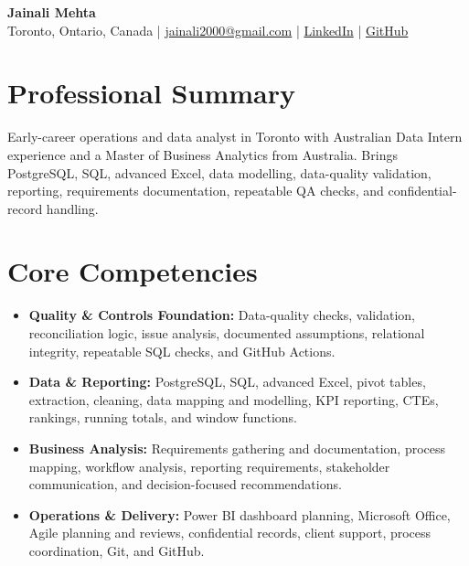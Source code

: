 \documentclass[letterpaper,10pt]{article}
\begin{document}
\begin{center}
  {\fontsize{17}{19}\selectfont\textbf{Jainali Mehta}}\\[2pt]
  \small Toronto, Ontario, Canada \;|\;
  \href{mailto:jainali2000@gmail.com}{jainali2000@gmail.com} \;|\;
  \href{https://www.linkedin.com/in/jainali-mehta}{LinkedIn} \;|\;
  \href{https://github.com/jainalimehta}{GitHub}
\end{center}
\vspace{-7pt}

\section{Professional Summary}
\small Early-career operations and data analyst in Toronto with Australian Data Intern experience and a Master of Business Analytics from Australia. Brings PostgreSQL, SQL, advanced Excel, data modelling, data-quality validation, reporting, requirements documentation, repeatable QA checks, and confidential-record handling.

\section{Core Competencies}
\begin{itemize}[leftmargin=0.16in,label=\textbullet,topsep=0pt,itemsep=1pt,parsep=0pt]
  \item \small \textbf{Quality \& Controls Foundation:} Data-quality checks, validation, reconciliation logic, issue analysis, documented assumptions, relational integrity, repeatable SQL checks, and GitHub Actions.
  \item \small \textbf{Data \& Reporting:} PostgreSQL, SQL, advanced Excel, pivot tables, extraction, cleaning, data mapping and modelling, KPI reporting, CTEs, rankings, running totals, and window functions.
  \item \small \textbf{Business Analysis:} Requirements gathering and documentation, process mapping, workflow analysis, reporting requirements, stakeholder communication, and decision-focused recommendations.
  \item \small \textbf{Operations \& Delivery:} Power BI dashboard planning, Microsoft Office, Agile planning and reviews, confidential records, client support, process coordination, Git, and GitHub.
\end{itemize}
\end{document}
